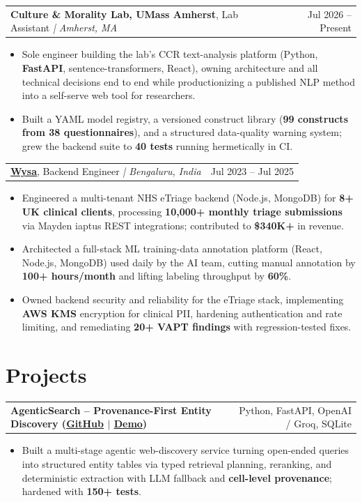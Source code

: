 \documentclass[letterpaper,11pt]{article}
\makeatletter
\newcommand{\expItem}[4]{%
  \vspace{2pt}
  \begin{tabular*}{\textwidth}{@{}l@{\extracolsep{\fill}}r@{}}
    \textbf{#1}, #2 \textit{| #3} & #4 \\
  \end{tabular*}\par\vspace{-3pt}
}
\newcommand{\projItem}[2]{%
  \vspace{2pt}
  \begin{tabular*}{\textwidth}{@{}l@{\extracolsep{\fill}}r@{}}
    \textbf{#1} & #2 \\
  \end{tabular*}\par\vspace{-3pt}
}
\makeatother
\begin{document}
\expItem{Culture \& Morality Lab, UMass Amherst}{Lab Assistant}{Amherst, MA}{Jul 2026 -- Present}
\begin{itemize}
  \item Sole engineer building the lab's CCR text-analysis platform (Python, \textbf{FastAPI}, sentence-transformers, React), owning architecture and all technical decisions end to end while productionizing a published NLP method into a self-serve web tool for researchers.
  \item Built a YAML model registry, a versioned construct library (\textbf{99 constructs from 38 questionnaires}), and a structured data-quality warning system; grew the backend suite to \textbf{40 tests} running hermetically in CI.
\end{itemize}

\expItem{\href{https://www.wysa.io}{Wysa}}{Backend Engineer}{Bengaluru, India}{Jul 2023 -- Jul 2025}
\begin{itemize}
  \item Engineered a multi-tenant NHS eTriage backend (Node.js, MongoDB) for \textbf{8+ UK clinical clients}, processing \textbf{10{,}000+ monthly triage submissions} via Mayden iaptus REST integrations; contributed to \textbf{\$340K+} in revenue.
  \item Architected a full-stack ML training-data annotation platform (React, Node.js, MongoDB) used daily by the AI team, cutting manual annotation by \textbf{100+ hours/month} and lifting labeling throughput by \textbf{60\%}.
  \item Owned backend security and reliability for the eTriage stack, implementing \textbf{AWS KMS} encryption for clinical PII, hardening authentication and rate limiting, and remediating \textbf{20+ VAPT findings} with regression-tested fixes.
\end{itemize}

\section{Projects}

\projItem{AgenticSearch -- Provenance-First Entity Discovery {\normalfont\small(\href{https://github.com/Deva-1903/ciir_agentic_search}{GitHub} $\vert$ \href{https://agentic-search-negglszkwa-uc.a.run.app}{Demo})}}{Python, FastAPI, OpenAI / Groq, SQLite}
\begin{itemize}
  \item Built a multi-stage agentic web-discovery service turning open-ended queries into structured entity tables via typed retrieval planning, reranking, and deterministic extraction with LLM fallback and \textbf{cell-level provenance}; hardened with \textbf{150+ tests}.
\end{itemize}
\end{document}
